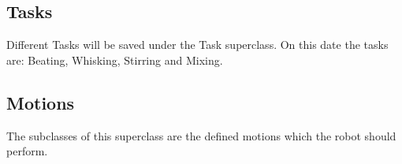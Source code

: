 \subsection*{Tasks}
Different Tasks will be saved under the Task superclass. On this date the tasks are:
Beating, Whisking, Stirring and Mixing.

\subsection*{Motions}
The subclasses of this superclass are the defined motions which the robot should perform.

